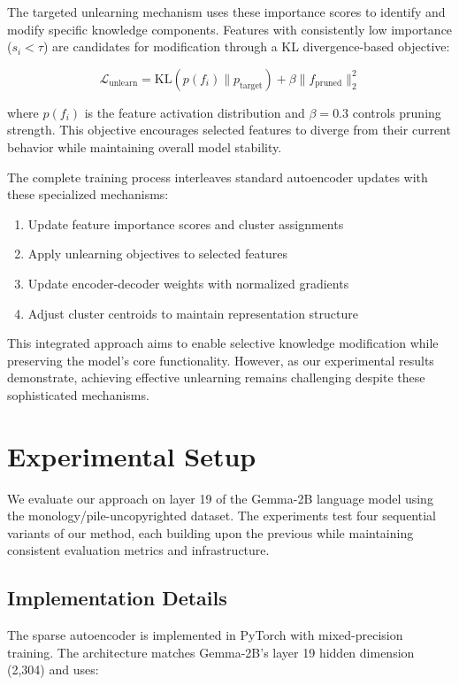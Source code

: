 \documentclass{article} %
\begin{document}
The targeted unlearning mechanism uses these importance scores to identify and modify specific knowledge components. Features with consistently low importance ($s_i < \tau$) are candidates for modification through a KL divergence-based objective:

\begin{equation}
    \mathcal{L}_{\text{unlearn}} = \text{KL}(p(f_i) \| p_{\text{target}}) + \beta\|f_{\text{pruned}}\|_2^2
\end{equation}

where $p(f_i)$ is the feature activation distribution and $\beta=0.3$ controls pruning strength. This objective encourages selected features to diverge from their current behavior while maintaining overall model stability.

The complete training process interleaves standard autoencoder updates with these specialized mechanisms:

\begin{enumerate}
    \item Update feature importance scores and cluster assignments
    \item Apply unlearning objectives to selected features
    \item Update encoder-decoder weights with normalized gradients
    \item Adjust cluster centroids to maintain representation structure
\end{enumerate}

This integrated approach aims to enable selective knowledge modification while preserving the model's core functionality. However, as our experimental results demonstrate, achieving effective unlearning remains challenging despite these sophisticated mechanisms.

\section{Experimental Setup}
\label{sec:experimental}

We evaluate our approach on layer 19 of the Gemma-2B language model using the monology/pile-uncopyrighted dataset. The experiments test four sequential variants of our method, each building upon the previous while maintaining consistent evaluation metrics and infrastructure.

\subsection{Implementation Details}
The sparse autoencoder is implemented in PyTorch \cite{paszke2019pytorch} with mixed-precision training. The architecture matches Gemma-2B's layer 19 hidden dimension (2,304) and uses:
\end{document}
